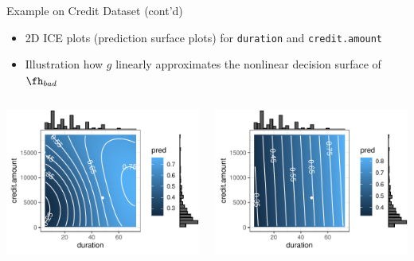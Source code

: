 \documentclass[11pt,compress,t,notes=noshow, aspectratio=169, xcolor=table]{beamer}
\begin{document}
\begin{frame}{Example on Credit Dataset (cont'd)}

\begin{itemize}
  \item 2D ICE plots (prediction surface plots) for \texttt{duration} and \texttt{credit.amount} 
  \item Illustration how \( g \) linearly approximates the nonlinear decision surface of \( \fh_{bad} \)
\end{itemize}

\begin{columns}[totalwidth=\textwidth]
  \begin{column}{0.47\textwidth}
    \centering
    \includegraphics[width=\linewidth]{figure/lime_credit_ice1.pdf}
  \end{column}
  \begin{column}{0.46\textwidth}
    \centering
    \includegraphics[width=\linewidth]{figure/lime_credit_ice2.pdf}
  \end{column}
\end{columns}


\end{frame}
\end{document}
